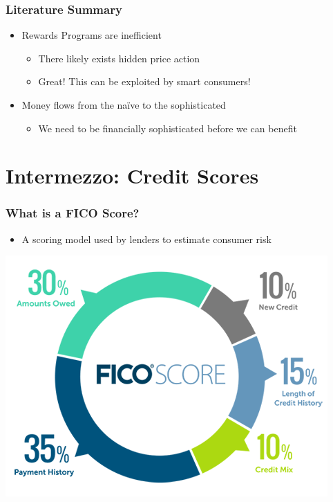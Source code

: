 \begin{frame}
    \frametitle{Literature Summary}
    \begin{itemize}
        \item<+-> Rewards Programs are inefficient
        \begin{itemize}
            \item There likely exists hidden price action
            \item Great! This can be exploited by smart consumers! 
        \end{itemize}
        \bigskip
        \item<+-> Money flows from the na\"{i}ve to the sophisticated
        \begin{itemize}
            \item We need to be financially sophisticated before we can benefit
        \end{itemize}
   \end{itemize}
 \end{frame}


\section{Intermezzo: Credit Scores}

\begin{frame}
    \frametitle{What is a FICO Score?}
    \begin{itemize}
        \item A scoring model used by lenders to estimate consumer risk 
    \end{itemize}
    \begin{center}
        \includegraphics[width=.75\textwidth]{../Misc/FICOComposition.png}
    \end{center}    
\end{frame}    

